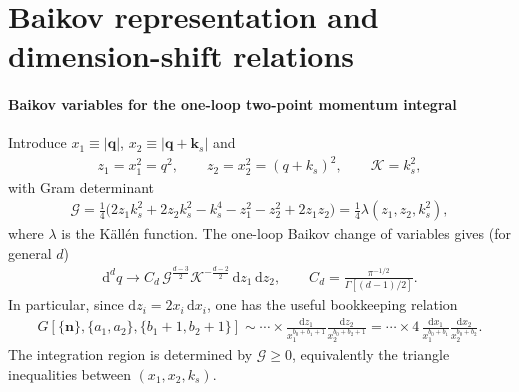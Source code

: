 \documentclass[a4paper,12pt]{article}
\def\di{{\mathrm{d}}}
\newcommand{\mG}{\mathcal{G}}
\newcommand{\mK}{\mathcal{K}}
\def\to{\rightarrow}
\begin{document}
\section{Baikov representation and dimension-shift relations}
\label{sec:baikov}
\paragraph{Baikov variables for the one-loop two-point momentum integral}
Introduce $x_1\equiv|\bm q|$, $x_2\equiv|\bm q+\bm k_s|$ and
\begin{align}
	z_1=x_1^2=q^2,\qquad z_2=x_2^2=(q+k_s)^2,\qquad \mK=k_s^2,
\end{align}
with Gram determinant
\begin{align}
	\mG=\frac{1}{4}\Big(2 z_1 k_s^2+2 z_2 k_s^2-k_s^4-z_1^2-z_2^2+2 z_1 z_2\Big)
	=\frac{1}{4}\lambda(z_1,z_2,k_s^2),
\end{align}
where $\lambda$ is the K\"all\'en function. The one-loop Baikov change of variables gives (for general $d$)
\begin{align}
	\di^d q \to C_d\,\mG^{\frac{d-3}{2}}\mK^{-\frac{d-2}{2}}\,\di z_1\,\di z_2,
	\qquad C_{d} = \frac{\pi^{-1/2}}{\Gamma[(d-1)/2]}.
\end{align}
In particular, since $\di z_i=2x_i\,\di x_i$, one has the useful bookkeeping relation
\begin{align}
	G[\{\bm{n}\},\{a_1,a_2\},\{b_1+1,b_2+1\}]
	\sim \cdots \times \frac{\di z_1}{x_1^{b_0+b_1+1}}\frac{\di z_2}{x_2^{b_0+b_2+1}}
	= \cdots \times 4\,\frac{\di x_1}{x_1^{b_0+b_1}}\frac{\di x_2}{x_2^{b_0+b_2}}.
\end{align}
The integration region is determined by $\mG\ge 0$, equivalently the triangle inequalities between $(x_1,x_2,k_s)$.
\end{document}
